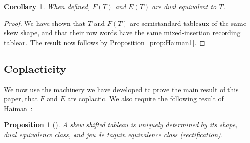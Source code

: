 \documentclass[10pt]{amsart}
\newtheorem{prop}[theorem]{Proposition}
\newtheorem{coro}[theorem]{Corollary}
\theoremstyle{definition}
\begin{document}
\begin{coro} \label{cor:FE-dual-equiv}
When defined, $F(T)$ and $E(T)$ are dual equivalent to $T$.
\end{coro}

\begin{proof}
We have shown that $T$ and $F(T)$ are semistandard tableaux of the same skew shape, and that their row words have the same mixed-insertion recording tableau. The result now follows by Proposition~\ref{prop:Haiman1}.
\end{proof}

\subsection{Coplacticity}

We now use the machinery we have developed to prove the main result of this paper, that $F$ and $E$ are coplactic. We also require the following result of Haiman~\cite{Haiman}:

\begin{prop}[{\cite[Theorem 2.13]{Haiman}}] \label{prop:Haiman2}
A skew shifted tableau is uniquely determined by its shape, dual equivalence class, and jeu de taquin equivalence class \textup{(}rectification\textup{)}.
\end{prop}
\end{document}
